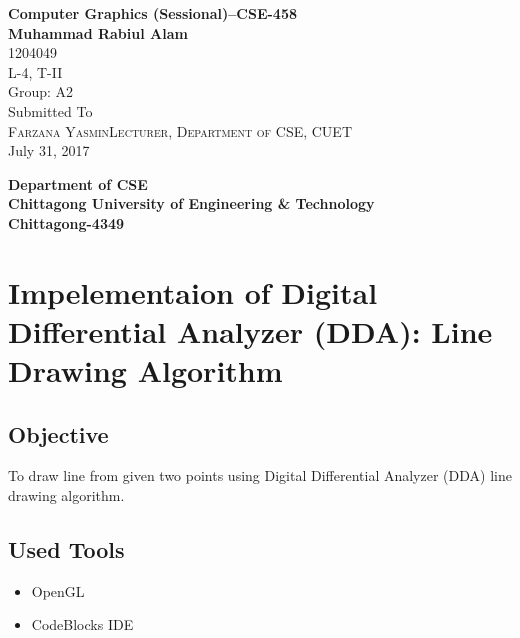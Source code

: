 \documentclass[11pt]{report}
\begin{document}
	\begin{titlepage}
		\begin{center}
			{\huge\bfseries Computer Graphics (Sessional)--CSE-458\\}
			\vspace{1.5cm}
			{\Large\bfseries Muhammad Rabiul Alam}\\[5pt]
			1204049\\[14pt]
			L-4, T-II\\[14pt]
			Group: A2\\[14pt]
			\vspace{2cm}
			{Submitted To} \\[8pt]
			\hspace{2.9cm}\textsc{\Large{{Farzana Yasmin\newline Lecturer, Department of CSE, CUET}}} \\[5pt]
			
			\vfill
			{July 31, 2017}
			
			\vfill
			{\bfseries Department of CSE}\\[11pt]
			{\bfseries Chittagong University of Engineering \& Technology}\\[11pt]
			{\bfseries Chittagong-4349}\\
			
		\end{center}
	\end{titlepage}
	\tableofcontents
	\listoffigures
	\renewcommand{\labelenumii}{\Roman{enumii}}
	
\chapter{Impelementaion of Digital Differential Analyzer (DDA): Line Drawing Algorithm}
\section{Objective}
To draw line from given two points using Digital Differential Analyzer (DDA) line drawing algorithm.
\section{Used Tools}
\begin{itemize}
	\item OpenGL
	\item CodeBlocks IDE
\end{itemize}
\end{document}
